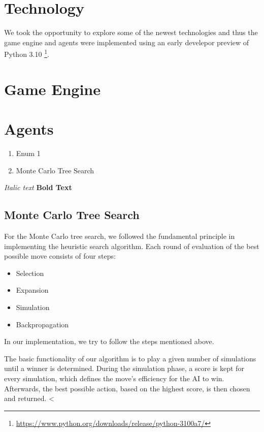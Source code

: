\section{Technology}
We took the opportunity to explore some of the newest technologies
and thus the game engine and agents were implemented using an early develepor preview of Python 3.10
\footnote{\url{https://www.python.org/downloads/release/python-3100a7/}}.

\section{Game Engine}

\section{Agents}
\begin{enumerate}
	\item Enum 1
	\item Monte Carlo Tree Search
\end{enumerate}

\textit{Italic text}
\textbf{Bold Text}

\subsection{Monte Carlo Tree Search}
For the Monte Carlo tree search, we followed the fundamental principle in implementing the heuristic search algorithm. Each round of evaluation of the best possible move consists of four steps:
\begin{itemize}
    \item Selection
    \item Expansion
    \item Simulation
    \item Backpropagation
\end{itemize}
In our implementation, we try to follow the steps mentioned above.

The basic functionality of our algorithm is to play a given number of simulations until a winner is determined. During the simulation phase, a score is kept for every simulation, which defines the move's efficiency for the AI to win. Afterwards, the best possible action, based on the highest score, is then chosen and returned.                                     
<